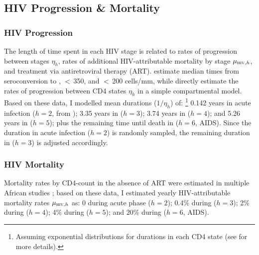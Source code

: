 \subsection{HIV Progression \& Mortality}\label{model.par.hiv}
\subsubsection{HIV Progression}\label{model.par.hiv.dur}
The length of time spent in each HIV stage is related to
rates of progression between stages $\eta_{h}$,
rates of additional HIV-attributable mortality by stage $\mu_{\textsc{hiv},h}$,
and treatment via antiretroviral therapy (ART).
\citet{Lodi2011} estimate median times from seroconversion to
, $<$\,350, and $<$\,200 cells/mm, while
\citet{Mangal2017} directly estimate the rates of progression between CD4 states $\eta_{h}$
in a simple compartmental model.
Based on these data, I modelled mean durations ($1/\eta_{h}$) of:%
\footnote{Assuming exponential distributions for durations in each CD4 state
  (see  for more details).}
0.142 years in acute infection ($h=2$, from );
3.35 years in  ($h=3$);
3.74 years in  ($h=4$); and
5.26 years in  ($h=5$); plus
the remaining time until death in  ($h=6$, AIDS).
Since the duration in acute infection ($h=2$) is randomly sampled,
the remaining duration in  ($h=3$) is adjusted accordingly.
\subsubsection{HIV Mortality}\label{model.par.hiv.mort}
Mortality rates by CD4-count in the absence of ART were estimated in
multiple African studies \cite{Badri2006,Anglaret2012,Mangal2017};
based on these data, I estimated yearly HIV-attributable mortality rates $\mu_{\textsc{hiv},h}$ as:
0 during acute phase ($h=2$);
0.4\% during  ($h=3$);
2\% during  ($h=4$);
4\% during  ($h=5$); and
20\% during  ($h=6$, AIDS).
